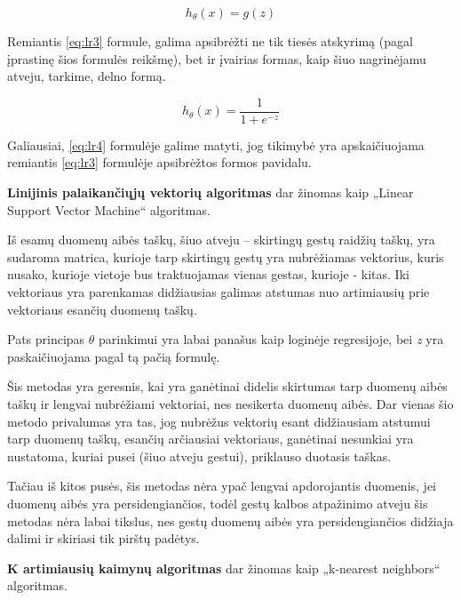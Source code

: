 \documentclass{VUMIFInfKursinis}
\begin{document}
\begin{equation}\label{eq:lr3}
	h_\theta(x)= g(z)
\end{equation}


Remiantis \ref{eq:lr3} formule, galima apsibrėžti ne tik tiesės atskyrimą (pagal įprastinę šios formulės reikšmę), bet ir įvairias formas, kaip šiuo nagrinėjamu atveju, tarkime, delno formą. 

\begin{equation}\label{eq:lr4}
	h_\theta(x) = \frac{1}{1+e^{-z}}
\end{equation}

Galiausiai, \ref{eq:lr4} formulėje galime matyti, jog tikimybė yra apskaičiuojama remiantis \ref{eq:lr3} formulėje apsibrėžtos formos pavidalu.


\textbf{Linijinis palaikančiųjų vektorių algoritmas} dar žinomas kaip „Linear Support Vector Machine“ algoritmas.

Iš esamų duomenų aibės taškų, šiuo atveju – skirtingų gestų raidžių taškų, yra sudaroma matrica, kurioje tarp skirtingų gestų yra nubrėžiamas vektorius, kuris nusako, kurioje vietoje bus traktuojamas vienas gestas, kurioje - kitas. Iki vektoriaus yra parenkamas didžiausias galimas atstumas nuo artimiausių prie vektoriaus esančių duomenų taškų. 

Pats principas $\theta$ parinkimui yra labai panašus kaip loginėje regresijoje, bei \textit{z} yra paskaičiuojama pagal tą pačią formulę.

Šis metodas yra geresnis, kai yra ganėtinai didelis skirtumas tarp duomenų aibės taškų ir lengvai nubrėžiami vektoriai, nes nesikerta duomenų aibės. Dar vienas šio metodo privalumas yra tas, jog nubrėžus vektorių esant didžiausiam atstumui tarp duomenų taškų, esančių arčiausiai vektoriaus, ganėtinai nesunkiai yra nustatoma, kuriai pusei (šiuo atveju gestui), priklauso duotasis taškas.

Tačiau iš kitos pusės, šis metodas nėra ypač lengvai apdorojantis duomenis, jei duomenų aibės yra persidengiančios, todėl gestų kalbos atpažinimo atveju šis metodas nėra labai tikslus, nes gestų duomenų aibės yra persidengiančios didžiaja dalimi ir skiriasi tik pirštų padėtys.


\textbf{K artimiausių kaimynų algoritmas} dar žinomas kaip „k-nearest neighbors“ algoritmas.
\end{document}
